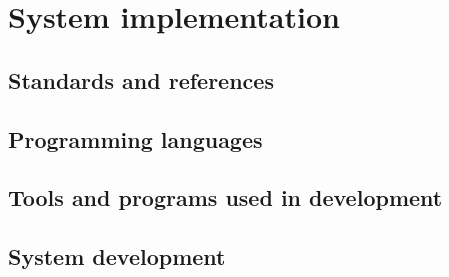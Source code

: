 \renewcommand{\documentname}{System implementation}

\chapter{System implementation}


\section{Standards and references}

\section{Programming languages}

\section{Tools and programs used in development}

\section{System development}

